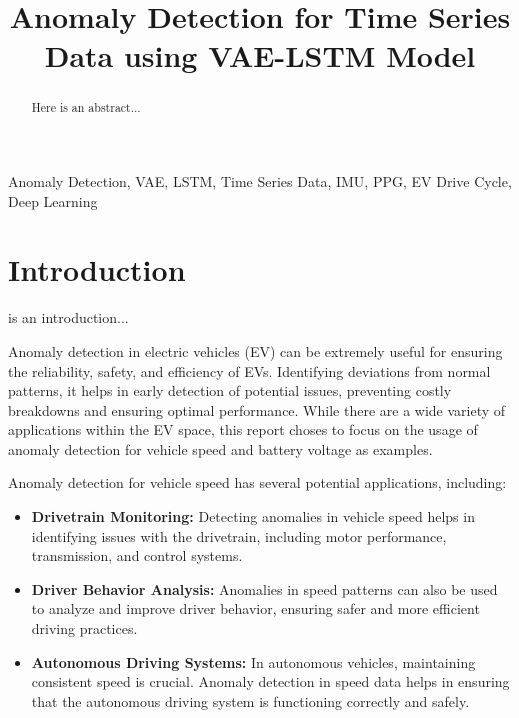 \documentclass[conference]{IEEEtran}
\begin{document}
\title{Anomaly Detection for Time Series Data using VAE-LSTM Model}

\author{
    \and
    \and
}

\maketitle

\begin{abstract}
Here is an abstract...
\end{abstract}

\begin{IEEEkeywords}
Anomaly Detection, VAE, LSTM, Time Series Data, IMU, PPG, EV Drive Cycle, Deep Learning
\end{IEEEkeywords}

\section{Introduction}
 is an introduction...

Anomaly detection in electric vehicles (EV) can be extremely useful for ensuring the reliability, safety, and efficiency of EVs. Identifying deviations from normal patterns, it helps in early detection of potential issues, preventing costly breakdowns and ensuring optimal performance. While there are a wide variety of applications within the EV space, this report choses to focus on the usage of anomaly detection for vehicle speed and battery voltage as examples.

Anomaly detection for vehicle speed has several potential applications, including:

\begin{itemize}
    \item \textbf{Drivetrain Monitoring:} Detecting anomalies in vehicle speed helps in identifying issues with the drivetrain, including motor performance, transmission, and control systems.
    \item \textbf{Driver Behavior Analysis:} Anomalies in speed patterns can also be used to analyze and improve driver behavior, ensuring safer and more efficient driving practices.
    \item \textbf{Autonomous Driving Systems:} In autonomous vehicles, maintaining consistent speed is crucial. Anomaly detection in speed data helps in ensuring that the autonomous driving system is functioning correctly and safely.
\end{itemize}
\end{document}
